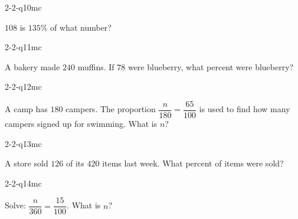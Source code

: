\begin{practiceQuestion}{2-2-q10}{mc}
\begin{questionText}
$108$ is $135\%$ of what number?
\end{questionText}
\end{practiceQuestion}

\begin{practiceQuestion}{2-2-q11}{mc}
\begin{questionText}
A bakery made $240$ muffins. If $78$ were blueberry, what percent were blueberry?
\end{questionText}
\end{practiceQuestion}

\begin{practiceQuestion}{2-2-q12}{mc}
\begin{questionText}
A camp has $180$ campers. The proportion $\dfrac{n}{180} = \dfrac{65}{100}$ is used to find how many campers signed up for swimming. What is $n$?
\end{questionText}
\end{practiceQuestion}

\begin{practiceQuestion}{2-2-q13}{mc}
\begin{questionText}
A store sold $126$ of its $420$ items last week. What percent of items were sold?
\end{questionText}
\end{practiceQuestion}

\begin{practiceQuestion}{2-2-q14}{mc}
\begin{questionText}
Solve: $\dfrac{n}{360} = \dfrac{15}{100}$. What is $n$?
\end{questionText}
\end{practiceQuestion}

